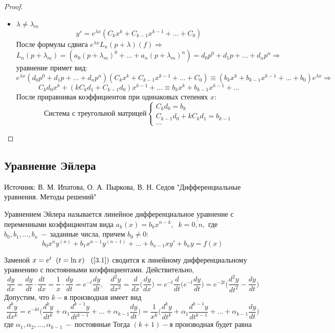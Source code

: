 \begin{proof}
\begin{itemize}
    \item $\lambda\neq \lambda_m$
    $$y^s=e^{\lambda x}(C_kx^k+C_{k-1}x^{k-1}+\dots+ C_0)$$
    После формулы сдвига $e^{\lambda x}L_n(p+\lambda)(f)\Rightarrow$
    $$L_n(p+\lambda_m)=(a_0(p+\lambda_m)^0+\dots+a_n(p+\lambda_m)^n)=d_0p^0+d_1p+\dots+d_np^n\Rightarrow$$
    уравнение примет вид:
    $$e^{\lambda x}(d_0p^0+d_1p+\dots+d_np^n)(C_kx^k+C_{k-1}x^{k-1}+\dots+C_0)\equiv (b_kx^k+b_{k-1}x^{k-1}+\dots +b_0)e^{\lambda x}\Rightarrow$$
    $$C_kd_0x^k+(kC_kd_1+C_{k-1}d_0)x^{k-1}+\dots\equiv b_kx^k+b_{k-1}x^{k-1}+\dots$$
    После приравнивая коэффициентов при одинаковых степенях $x$:
    \begin{equation}
    \text{Система с треугольной матрицей}
        \begin{cases}
            C_kd_0=b_k\\
            C_{k-1}d_0+kC_kd_1=b_{k-1}\\
            \dots
        \end{cases}
    \end{equation}
\end{itemize}
\end{proof}

\subsection{Уравнение Эйлера}

\begin{remark}
    Источник: В. М. Ипатова, О. А. Пыркова, В. Н. Седов "Дифференциальные уравнения. Методы решений"
\end{remark}

\begin{definition}
    Уравнением Эйлера называется линейное дифференциальное уравнение с переменными 
    коэффициентам вида $a_k(x)=b_kx^{n-k}, \;\;k=\overline{0, n},$ где $b_0, b_1, \dots, b_n~-~$заданные числа, причем $b_0\neq 0:$
    \begin{equation}
        \tag{3.1}
        \label{3.1}
        b_0x^ny^{(n)}+b_1x^{n-1}y^{(n-1)}+\dots+b_{n-1}xy'+b_ny=f(x)
    \end{equation}
\end{definition}

Заменой $x=e^t\;\;(t=\ln x)\;\;\;(\ref{3.1})$ сводится к линейному дифференциальному уравнению с постоянными коэффициентами. Действительно, $$\frac{dy}{dx}=\frac{dy}{dt}\cdot\frac{dt}{dx}=\frac{1}{x}\cdot \frac{dy}{dt}=e^{-t}\frac{dy}{dt}, \;\;\;\frac{d^2y}{dx^2}=\frac{d}{dx}\Big(\frac{dy}{dx}\Big)=e^{-t}\frac{d}{dt}\Big(e^{-t}\frac{dy}{dt}\Big)=e^{-2t}\Big(\frac{d^2y}{dt^2}-\frac{dy}{dt}\Big)$$
Допустим, что $k-$я производная имеет вид $$\frac{d^ky}{dx^k}=e^{-kt}\Big(\frac{d^ky}{dt^k}+\alpha_1\frac{d^{k-1}y}{dt^{k-1}}+\dots+\alpha_{k-1}\frac{dy}{dt}\Big)=\frac{1}{x^k}\Big(\frac{d^ky}{dt^k}+\alpha_1\frac{d^{k-1}y}{dt^{k-1}}+\dots+\alpha_{k-1}\frac{dy}{dt}\Big)$$ где $\alpha_1, \alpha_2, \dots, \alpha_{k-1}~-~\text{постоянные}$
Тогда $(k+1)-$я производная будет равна


